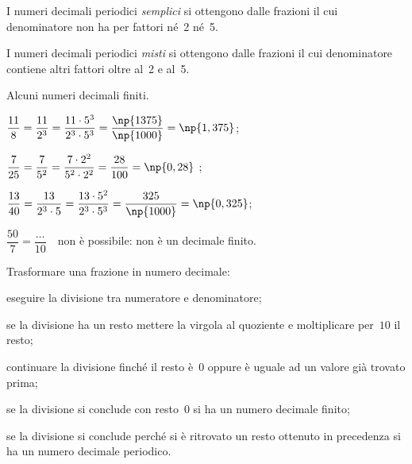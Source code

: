I numeri decimali periodici \emph{semplici} si ottengono dalle frazioni il cui denominatore non ha per fattori né~2 né~5.

I numeri decimali periodici \emph{misti} si ottengono dalle frazioni il cui denominatore contiene altri fattori oltre al~2
e al~5.

\begin{exrig}
 \begin{esempio}
 Alcuni numeri decimali finiti.
\begin{enumeratea}
 \item $\dfrac{11}{8}=\dfrac{11}{2^3}=
\dfrac{11\cdot 5^3}{2^3\cdot 5^3}=\dfrac{\np{1375}}{\np{1000}}=\np{1,375}$;
 \item $\dfrac{7}{25}=\dfrac{7}{5^2}=
\dfrac{7\cdot 2^2}{5^2\cdot 2^2}=\dfrac{28}{100}=\np{0,28}~$;
 \item $\dfrac{13}{40}=\dfrac{13}{2^3\cdot 5}=
\dfrac{13\cdot 5^2}{2^3\cdot 5^3}=\dfrac{325}{\np{1000}}=\np{0,325}$;
 \item $\dfrac{50}{7} = \dfrac{\ldots}{10}$~~non è possibile: non è un decimale finito.
\end{enumeratea}
 \end{esempio}
\end{exrig}

\ovalbox{\risolvi \ref{ese:3.23}}

\begin{procedura}
Trasformare una frazione in numero decimale:
\begin{enumeratea}
 \item eseguire la divisione tra numeratore e denominatore;
 \item se la divisione ha un resto mettere la virgola al quoziente e moltiplicare per~$10$ il resto;
 \item continuare la divisione finché il resto è~$0$ oppure è uguale ad un valore già trovato prima;
 \item se la divisione si conclude con resto~$0$ si ha un numero decimale finito;
 \item se la divisione si conclude perché si è ritrovato un resto ottenuto in precedenza si ha un
numero decimale periodico.
\end{enumeratea}
\end{procedura}

